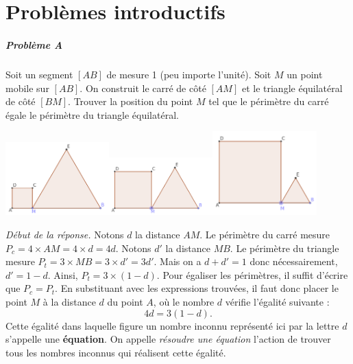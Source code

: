 
\chapter{Problèmes introductifs}



	\paragraph{Problème A} Soit un segment $[AB]$ de mesure 1 (peu importe l'unité). Soit $M$ un point mobile sur $[AB]$. On construit le carré de côté $[AM]$ et le triangle équilatéral de côté $[BM]$.
	Trouver la position du point $M$ tel que le périmètre du carré égale le périmètre du triangle équilatéral.

	\includegraphics[width=0.3\textwidth]{image/calcul/pbtricar1.png}\includegraphics[width=0.3\textwidth]{image/calcul/pbtricar2.png}\includegraphics[width=0.3\textwidth]{image/calcul/pbtricar3.png}

	\emph{Début de la réponse.}
	Notons $d$ la distance $AM$. Le périmètre du carré mesure $P_c=4\times AM=4\times d = 4d$. 
	Notons $d'$ la distance $MB$. Le périmètre du triangle mesure $P_t=3\times MB = 3\times d'=3d'$. Mais on a $d+d'=1$ donc nécessairement, $d'=1-d$. Ainsi, $P_t=3\times(1-d)$. Pour égaliser les périmètres, il suffit d'écrire que $P_c=P_t$. En substituant avec les expressions trouvées, il faut donc placer le point $M$ à la distance $d$ du point $A$, où le nombre $d$ vérifie l'égalité suivante :
	\begin{equation}
		4d=3(1-d).
	\end{equation}
	Cette égalité dans laquelle figure un nombre inconnu représenté ici par la lettre $d$ s'appelle une {\bfseries équation}. On appelle \emph{résoudre une équation} l'action de trouver tous les nombres inconnus qui réalisent cette égalité.

